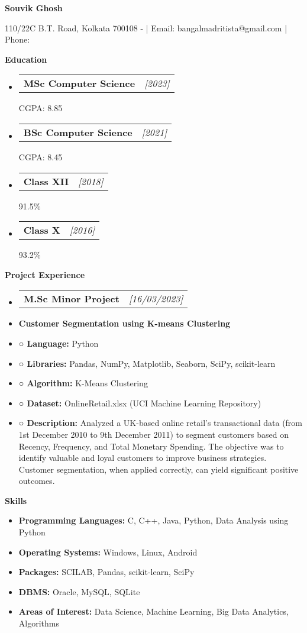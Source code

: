 \documentclass[a4paper,10pt]{article}
\makeatletter
\newcommand{\resitem}[1]{\item #1}
\newcommand{\resheading}[1]{\vspace{0.5em} {\small \colorbox{mygrey}{{\begin{minipage}{0.975\textwidth}{{\textbf{#1}}}\end{minipage}}}} \vspace{0.5em}}
\newcommand{\ressubheading}[3]{\begin{tabular*}{6.62in}{l @{\extracolsep{\fill}} r} \textbf{#1} & \textit{[#2]} \\ \end{tabular*}\vspace{-8pt}}
\makeatother
\begin{document}
\begin{center} \Large{\textbf{Souvik Ghosh}} \end{center}

\vspace{2pt}

\begin{center} 110/22C B.T. Road, Kolkata 700108 - | Email: bangalmadritista@gmail.com | Phone: \end{center}

\resheading{Education}
\begin{itemize}[noitemsep]
    \resitem{\ressubheading{MSc Computer Science}{2023}{Banaras Hindu University, Varanasi} CGPA: 8.85}
    \resitem{\ressubheading{BSc Computer Science}{2021}{Scottish Church College, University of Calcutta, Kolkata} CGPA: 8.45}
    \resitem{\ressubheading{Class XII}{2018}{Central Modern School, Council for the Indian School Certificate Examinations} 91.5\%}
    \resitem{\ressubheading{Class X}{2016}{Central Modern School, Council for the Indian School Certificate Examinations} 93.2\%}
\end{itemize}

\resheading{Project Experience}
\begin{itemize}[noitemsep]
    \resitem{\ressubheading{M.Sc Minor Project}{16/03/2023}{}}
    \resitem{\textbf{Customer Segmentation using K-means Clustering}}
    \resitem{\textbf{○ Language:} Python}
    \resitem{\textbf{○ Libraries:} Pandas, NumPy, Matplotlib, Seaborn, SciPy, scikit-learn}
    \resitem{\textbf{○ Algorithm:} K-Means Clustering}
    \resitem{\textbf{○ Dataset:} OnlineRetail.xlsx (UCI Machine Learning Repository)}
    \resitem{\textbf{○ Description:} Analyzed a UK-based online retail’s transactional data (from 1st December 2010 to 9th December 2011) to segment customers based on Recency, Frequency, and Total Monetary Spending.  The objective was to identify valuable and loyal customers to improve business strategies.  Customer segmentation, when applied correctly, can yield significant positive outcomes.}
\end{itemize}

\resheading{Skills}
\begin{itemize}[noitemsep]
    \resitem{\textbf{Programming Languages:} C, C++, Java, Python, Data Analysis using Python}
    \resitem{\textbf{Operating Systems:} Windows, Linux, Android}
    \resitem{\textbf{Packages:} SCILAB, Pandas, scikit-learn, SciPy}
    \resitem{\textbf{DBMS:} Oracle, MySQL, SQLite}
    \resitem{\textbf{Areas of Interest:} Data Science, Machine Learning, Big Data Analytics, Algorithms}
\end{itemize}
\end{document}
